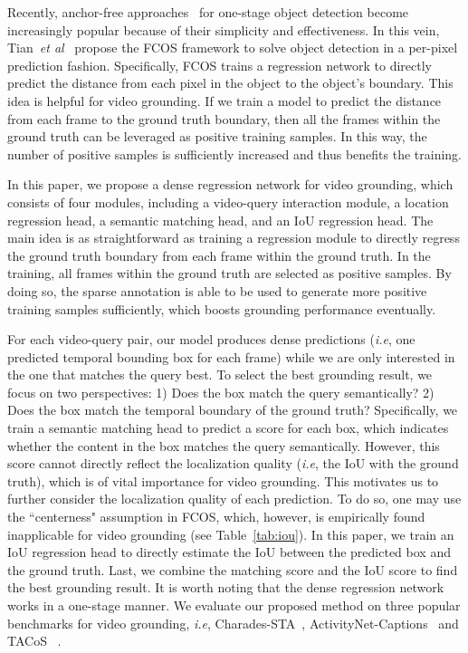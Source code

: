 \documentclass[10pt,twocolumn,letterpaper]{article}
\def\ie{\emph{i.e}\onedot} \def\Ie{\emph{I.e}\onedot}
\def\etal{\emph{et al}\onedot}
\begin{document}
Recently, anchor-free approaches~\cite{huang2015densebox, redmon2016you, tian2019fcos, law2018cornernet, kong2019foveabox} for one-stage object detection become increasingly popular because of their simplicity and effectiveness. In this vein, Tian~\etal~\cite{tian2019fcos} propose the FCOS framework to solve object detection in a per-pixel prediction fashion. Specifically, FCOS trains a regression network to directly predict the distance from each pixel in the object to the object's boundary. 
	This idea is helpful for video grounding. If we train a model to predict the distance from each frame to the ground truth boundary, then all the frames within the ground truth can be leveraged as positive training samples. In this way, the number of positive samples is sufficiently increased and thus benefits the training. 
	




	In this paper, we propose a dense regression network for video grounding, which consists of four modules, including a video-query interaction module, a location regression head, a semantic matching head, and an IoU regression head.
	The main idea is as straightforward as training a regression module to directly regress the ground truth boundary from each frame within the ground truth.
	In the training, all frames within the ground truth are selected as positive samples. 
	By doing so, the sparse annotation is able to be used to generate more positive training samples sufficiently, which boosts grounding performance eventually.
	
	For each video-query pair, our model produces dense predictions (\ie, one predicted temporal bounding box for each frame) while we are only interested in the one that matches the query best. To select the best grounding result, we focus on two perspectives: 1) Does the box match the query semantically? 2) Does the box match the temporal boundary of the ground truth? Specifically, we train a semantic matching head to predict a score for each box, which indicates whether the content in the box matches the query semantically. However, this score cannot directly reflect the localization quality (\ie, the IoU with the ground truth), which is of vital importance for video grounding. This motivates us to further consider the localization quality of each prediction. To do so, one may use the ``centerness" assumption in FCOS, which, however, is empirically found inapplicable for video grounding (see Table~\ref{tab:iou}).
In this paper, we train an IoU regression head to directly estimate the IoU between the predicted box and the ground truth. Last, we combine the matching score and the IoU score to find the best grounding result.
	It is worth noting that the dense regression network works in a one-stage manner.
We evaluate our proposed method on three popular benchmarks for video grounding, \ie, Charades-STA~\cite{gao2017tall}, ActivityNet-Captions~\cite{krishna2017dense} and TACoS ~\cite{regneri2013grounding}.
	
\end{document}
